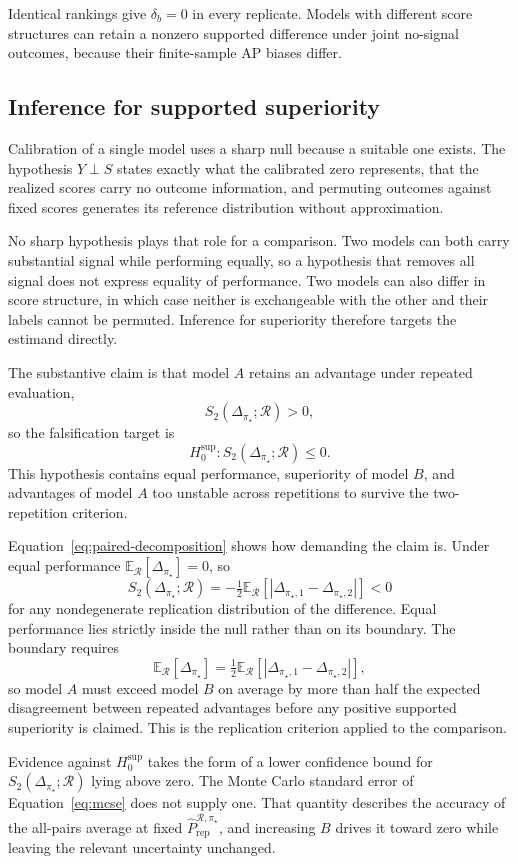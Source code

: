 \documentclass[11pt]{article}
\newcommand{\Regime}{\mathcal{R}}
\newcommand{\E}{\mathbb{E}}
\newcommand{\PRepHat}{\widehat{P}_{\mathrm{rep}}^{\Regime,\pi_\star}}
\theoremstyle{remark}
\begin{document}
Identical rankings give $\delta_b=0$ in every replicate. Models with different score structures can retain a nonzero supported difference under joint no-signal outcomes, because their finite-sample AP biases differ.

\subsection{Inference for supported superiority}
\label{sec:superiority}

Calibration of a single model uses a sharp null because a suitable one exists. The hypothesis $Y\perp S$ states exactly what the calibrated zero represents, that the realized scores carry no outcome information, and permuting outcomes against fixed scores generates its reference distribution without approximation.

No sharp hypothesis plays that role for a comparison. Two models can both carry substantial signal while performing equally, so a hypothesis that removes all signal does not express equality of performance. Two models can also differ in score structure, in which case neither is exchangeable with the other and their labels cannot be permuted. Inference for superiority therefore targets the estimand directly.

The substantive claim is that model $A$ retains an advantage under repeated evaluation,
\[
S_2(\Delta_{\pi_\star};\Regime)>0,
\]
so the falsification target is
\[
H_0^{\mathrm{sup}}:
S_2(\Delta_{\pi_\star};\Regime)\leq 0 .
\]
This hypothesis contains equal performance, superiority of model $B$, and advantages of model $A$ too unstable across repetitions to survive the two-repetition criterion.

Equation~\eqref{eq:paired-decomposition} shows how demanding the claim is. Under equal performance $\E_{\Regime}[\Delta_{\pi_\star}]=0$, so
\[
S_2(\Delta_{\pi_\star};\Regime)
=
-\tfrac12\E_{\Regime}\left[|\Delta_{\pi_\star,1}-\Delta_{\pi_\star,2}|\right]
<
0
\]
for any nondegenerate replication distribution of the difference. Equal performance lies strictly inside the null rather than on its boundary. The boundary requires
\[
\E_{\Regime}[\Delta_{\pi_\star}]
=
\tfrac12
\E_{\Regime}\left[|\Delta_{\pi_\star,1}-\Delta_{\pi_\star,2}|\right],
\]
so model $A$ must exceed model $B$ on average by more than half the expected disagreement between repeated advantages before any positive supported superiority is claimed. This is the replication criterion applied to the comparison.

Evidence against $H_0^{\mathrm{sup}}$ takes the form of a lower confidence bound for $S_2(\Delta_{\pi_\star};\Regime)$ lying above zero. The Monte Carlo standard error of Equation~\eqref{eq:mcse} does not supply one. That quantity describes the accuracy of the all-pairs average at fixed $\PRepHat$, and increasing $B$ drives it toward zero while leaving the relevant uncertainty unchanged.
\end{document}
